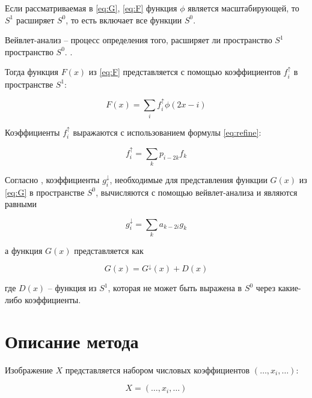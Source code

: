 Если рассматриваемая в \ref{eq:G}, \ref{eq:F} функция $\phi$ является масштабирующей, то $S^1$ расширяет $S^0$, то есть включает все функции $S^0$. \cite{pixar,Novikov}

Вейвлет-анализ -- процесс определения того, расширяет ли пространство $S^1$ пространство $S^0$. \cite{pixar}.

Тогда функция $F(x)$ из \ref{eq:F} представляется с помощью коэффициентов $f_i^{\uparrow}$ в пространстве $S^1$:

\begin{equation}\label{eq:Fup}
	F(x)=\sum_{i}f_i^{\uparrow}\phi(2x-i)
\end{equation}

Коэффициенты $f_i^{\uparrow}$ выражаются с использованием формулы \ref{eq:refine}:

\begin{equation}\label{eq:f_iup}
	f_i^{\uparrow}=\sum_{k}p_{i-2k}f_k
\end{equation}

Согласно \cite{pixar}, коэффициенты $g_i^{\downarrow}$, необходимые для представления функции $G(x)$ из \ref{eq:G} в пространстве $S^0$, вычисляются с помощью вейвлет-анализа и являются равными

\begin{equation}\label{eq:g_idown}
	g_i^{\downarrow}=\sum_{k}a_{k-2i}g_k
\end{equation}

а функция $G(x)$ представляется как

\begin{equation}\label{eq:G_divide}
	G(x)=G^{\downarrow}(x) + D(x)
\end{equation}

где $D(x)$ -- функция из $S^1$, которая не может быть выражена в $S^0$ через какие-либо коэффициенты.

\section{Описание метода}

Изображение $X$ представляется набором числовых коэффициентов $(\dots,x_i,\dots)$:

\begin{equation}\label{eq:x_image}
	X=(\dots,x_i,\dots)
\end{equation}

